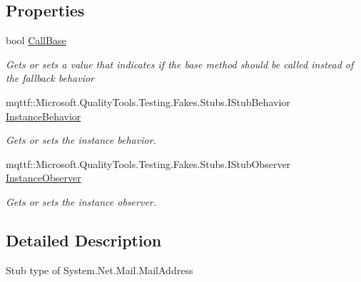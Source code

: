 \subsection*{Properties}
\begin{DoxyCompactItemize}
\item 
bool \hyperlink{class_system_1_1_net_1_1_mail_1_1_fakes_1_1_stub_mail_address_a8a4a74a2d1d4bfef39c14ab6b5fd28cd}{Call\-Base}
\begin{DoxyCompactList}\small\item\em Gets or sets a value that indicates if the base method should be called instead of the fallback behavior\end{DoxyCompactList}\item 
mqttf\-::\-Microsoft.\-Quality\-Tools.\-Testing.\-Fakes.\-Stubs.\-I\-Stub\-Behavior \hyperlink{class_system_1_1_net_1_1_mail_1_1_fakes_1_1_stub_mail_address_a15482c970237108f39903d8917c3853b}{Instance\-Behavior}
\begin{DoxyCompactList}\small\item\em Gets or sets the instance behavior.\end{DoxyCompactList}\item 
mqttf\-::\-Microsoft.\-Quality\-Tools.\-Testing.\-Fakes.\-Stubs.\-I\-Stub\-Observer \hyperlink{class_system_1_1_net_1_1_mail_1_1_fakes_1_1_stub_mail_address_ad2c3b48d73e43211a24c1e37eb6f7c50}{Instance\-Observer}
\begin{DoxyCompactList}\small\item\em Gets or sets the instance observer.\end{DoxyCompactList}\end{DoxyCompactItemize}


\subsection{Detailed Description}
Stub type of System.\-Net.\-Mail.\-Mail\-Address



